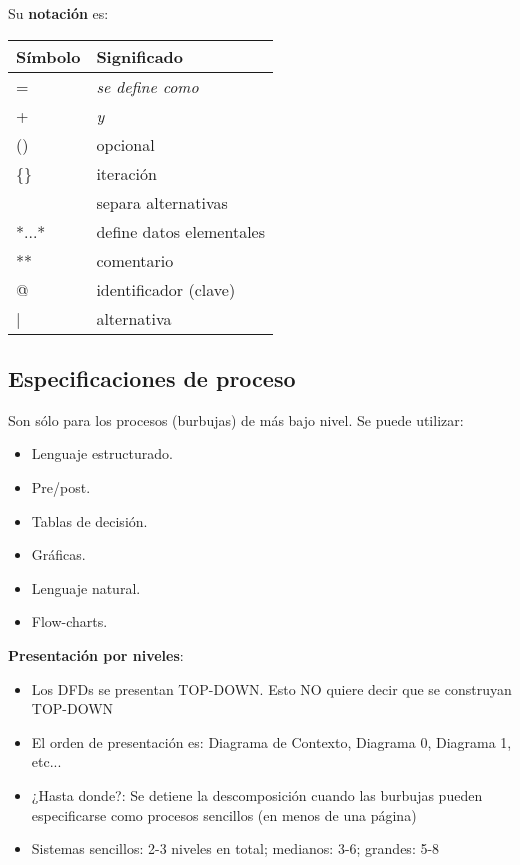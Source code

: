 Su \textbf{notación} es:

\begin{center}
  \begin{tabular}[h]{ l | l }
    \textbf{Símbolo}   & \textbf{Significado} \\
    \hline
    =                  & \textit{se define como} \\
    +                  & \textit{y} \\
    ()                 & opcional \\
    \{\}               & iteración \\
    \big[\big]         & separa alternativas \\
    *...*              & define datos elementales \\
    **                 & comentario \\
    @                  & identificador (clave) \\
    |                  & alternativa \\
  \end{tabular}
\end{center}

\subsection{Especificaciones de proceso}

Son sólo para los procesos (burbujas) de más bajo nivel. Se puede utilizar:

\begin{itemize}[noitemsep]
\item Lenguaje estructurado.
\item Pre/post.
\item Tablas de decisión.
\item Gráficas.
\item Lenguaje natural.
\item Flow-charts.
\end{itemize}

\textbf{Presentación por niveles}:

\begin{itemize}[noitemsep]
\item Los DFDs se presentan TOP-DOWN. Esto NO quiere decir que se construyan TOP-DOWN
\item El orden de presentación es: Diagrama de Contexto, Diagrama 0, Diagrama 1, etc...
\item ¿Hasta donde?: Se detiene la descomposición cuando las burbujas pueden especificarse como procesos sencillos (en menos de una página)
\item Sistemas sencillos: 2-3 niveles en total; medianos: 3-6; grandes: 5-8
\end{itemize}


